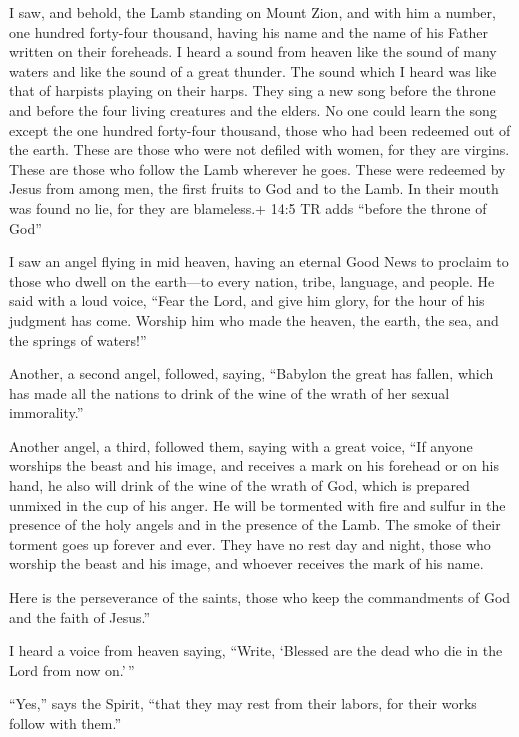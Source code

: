  I saw, and behold, the Lamb standing on Mount Zion, and
with him a number, one hundred forty-four thousand, having his name and
the name of his Father written on their foreheads.  I heard
a sound from heaven like the sound of many waters and like the sound of
a great thunder. The sound which I heard was like that of harpists
playing on their harps.  They sing a new song before the
throne and before the four living creatures and the elders. No one could
learn the song except the one hundred forty-four thousand, those who had
been redeemed out of the earth.  These are those who were
not defiled with women, for they are virgins. These are those who follow
the Lamb wherever he goes. These were redeemed by Jesus from among men,
the first fruits to God and to the Lamb.  In their mouth was
found no lie, for they are blameless.+ 14:5 TR adds ``before the throne
of God''

 I saw an angel flying in mid heaven, having an eternal Good
News to proclaim to those who dwell on the earth---to every nation,
tribe, language, and people.  He said with a loud voice,
``Fear the Lord, and give him glory, for the hour of his judgment has
come. Worship him who made the heaven, the earth, the sea, and the
springs of waters!''

 Another, a second angel, followed, saying, ``Babylon the
great has fallen, which has made all the nations to drink of the wine of
the wrath of her sexual immorality.''

 Another angel, a third, followed them, saying with a great
voice, ``If anyone worships the beast and his image, and receives a mark
on his forehead or on his hand,  he also will drink of the
wine of the wrath of God, which is prepared unmixed in the cup of his
anger. He will be tormented with fire and sulfur in the presence of the
holy angels and in the presence of the Lamb.  The smoke of
their torment goes up forever and ever. They have no rest day and night,
those who worship the beast and his image, and whoever receives the mark
of his name.

 Here is the perseverance of the saints, those who keep the
commandments of God and the faith of Jesus.''

 I heard a voice from heaven saying, ``Write, `Blessed are
the dead who die in the Lord from now on.'\,''

``Yes,'' says the Spirit, ``that they may rest from their labors, for
their works follow with them.''

